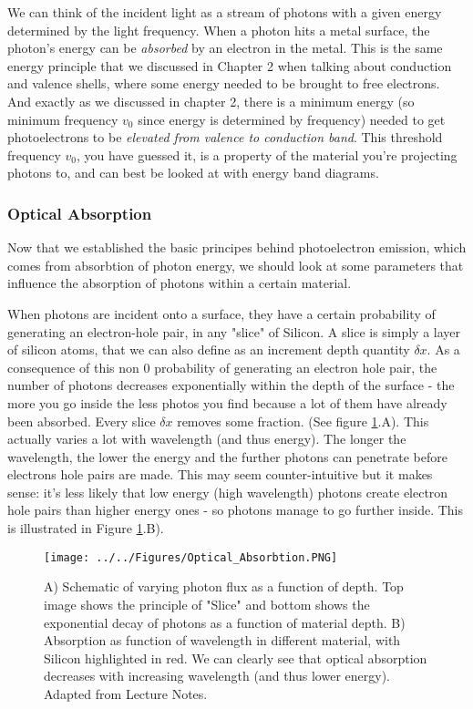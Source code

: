 We can think of the incident light as a stream of photons with a given energy determined by the light frequency. When a photon hits a metal surface, the photon's energy can be \textit{absorbed} by an electron in the metal. This is the same energy principle that we discussed in Chapter 2 when talking about conduction and valence shells, where some energy needed to be brought to free electrons. And exactly as we discussed in chapter 2, there is a minimum energy (so minimum frequency $v_0$ since energy is determined by frequency) needed to get photoelectrons to be \textit{elevated from valence to conduction band}.  This threshold frequency $v_0$, you have guessed it, is a property of the material you're projecting photons to, and can best be looked at with energy band diagrams. 

\subsubsection{Optical Absorption}


Now that we established the basic principes behind photoelectron emission, which comes from absorbtion of photon energy, we should look at some parameters that influence the absorption of photons within a certain material.

When photons are incident onto a surface, they have a certain probability of generating an electron-hole pair, in any "slice" of Silicon. A slice is simply a layer of silicon atoms, that we can also define as an increment depth quantity $\delta x$. As a consequence of this non 0 probability of generating an electron hole pair, the number of photons decreases exponentially within the depth of the surface - the more you go inside the less photos you find because a lot of them have already been absorbed. Every slice $\delta x$ removes some fraction. (See figure \ref{fig:Optical_Absorbtion}.A). This actually varies a lot with wavelength (and thus energy). The longer the wavelength, the lower the energy and the further photons can penetrate before electrons hole pairs are made. This may seem counter-intuitive but it makes sense: it's less likely that low energy (high wavelength) photons create electron hole pairs than higher energy ones - so photons manage to go further inside. This is illustrated in Figure \ref{fig:Optical_Absorbtion}.B). 

\begin{figure}[H]
    \centering
    \texttt{[image: ../../Figures/Optical\_Absorbtion.PNG]}
    \caption{A) Schematic of varying photon flux as a function of depth. Top image shows the principle of "Slice" and bottom shows the exponential decay of photons as a function of material depth. B) Absorption as function of wavelength in different material, with Silicon highlighted in red. We can clearly see that optical absorption decreases with increasing wavelength (and thus lower energy). Adapted from Lecture Notes.}
    \label{fig:Optical_Absorbtion}
\end{figure}

